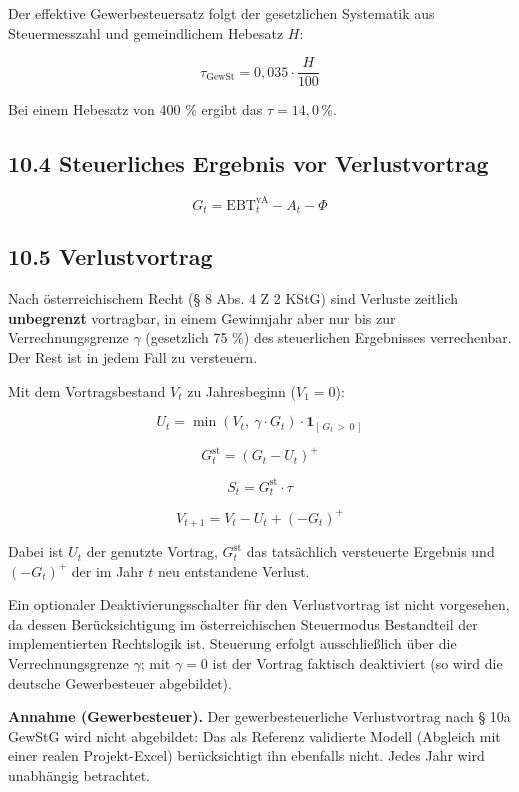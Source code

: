 \documentclass[
  a4paper,
  10pt]{article}
\renewenvironment{quote}
  {\begin{tcolorbox}[
      enhanced,
      breakable,
      colback=Wash,
      colframe=Brand,
      boxrule=0pt,
      leftrule=2.2pt,
      arc=0pt,
      left=8pt,right=8pt,top=6pt,bottom=6pt,
      before skip=8pt,after skip=9pt
    ]\small\color{InkSoft}}
  {\end{tcolorbox}}
\begin{document}
Der effektive Gewerbesteuersatz folgt der gesetzlichen Systematik aus
Steuermesszahl und gemeindlichem Hebesatz \(H\):

\[ \tau_{\mathrm{GewSt}} = 0{,}035 \cdot \frac{H}{100} \]

Bei einem Hebesatz von 400 \% ergibt das \(\tau = 14{,}0\,\%\).

\hypertarget{steuerliches-ergebnis-vor-verlustvortrag}{%
\subsection{10.4 Steuerliches Ergebnis vor
Verlustvortrag}\label{steuerliches-ergebnis-vor-verlustvortrag}}

\[ G_t = \mathrm{EBT}^{\mathrm{vA}}_t - A_t - \Phi \]

\hypertarget{verlustvortrag}{%
\subsection{10.5 Verlustvortrag}\label{verlustvortrag}}

Nach österreichischem Recht (§ 8 Abs. 4 Z 2 KStG) sind Verluste zeitlich
\textbf{unbegrenzt} vortragbar, in einem Gewinnjahr aber nur bis zur
Verrechnungsgrenze \(\gamma\) (gesetzlich 75 \%) des steuerlichen
Ergebnisses verrechenbar. Der Rest ist in jedem Fall zu versteuern.

Mit dem Vortragsbestand \(V_t\) zu Jahresbeginn (\(V_1 = 0\)):

\[ U_t = \min\left(V_t,\ \gamma \cdot G_t\right) \cdot \mathbf{1}_{[\,G_t\, >\, 0\,]} \]

\[ G^{\mathrm{st}}_t = \left(G_t - U_t\right)^{+} \]

\[ S_t = G^{\mathrm{st}}_t \cdot \tau \]

\[ V_{t+1} = V_t - U_t + \left(-G_t\right)^{+} \]

Dabei ist \(U_t\) der genutzte Vortrag, \(G^{\mathrm{st}}_t\) das
tatsächlich versteuerte Ergebnis und \((-G_t)^{+}\) der im Jahr \(t\)
neu entstandene Verlust.

Ein optionaler Deaktivierungsschalter für den Verlustvortrag ist nicht
vorgesehen, da dessen Berücksichtigung im österreichischen Steuermodus
Bestandteil der implementierten Rechtslogik ist. Steuerung erfolgt
ausschließlich über die Verrechnungsgrenze \(\gamma\); mit
\(\gamma = 0\) ist der Vortrag faktisch deaktiviert (so wird die
deutsche Gewerbesteuer abgebildet).

\begin{quote}
\textbf{Annahme (Gewerbesteuer).} Der gewerbesteuerliche Verlustvortrag
nach § 10a GewStG wird nicht abgebildet: Das als Referenz validierte
Modell (Abgleich mit einer realen Projekt-Excel) berücksichtigt ihn
ebenfalls nicht. Jedes Jahr wird unabhängig betrachtet.
\end{quote}
\end{document}

